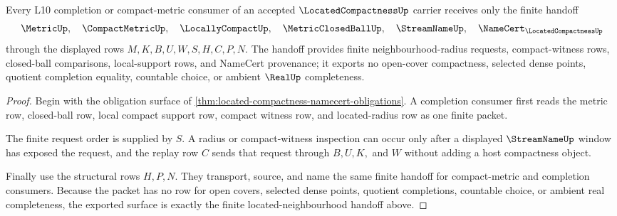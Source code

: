 \begin{theorem}
\label{thm:located-compactness-finite-net-handoff}
Every L10 completion or compact-metric consumer of an accepted $\LocatedCompactnessUp$ carrier receives only the finite handoff
$$
\MetricUp,\quad \CompactMetricUp,\quad \LocallyCompactUp,\quad \MetricClosedBallUp,\quad \StreamNameUp,\quad \NameCert_{\LocatedCompactnessUp}
$$
through the displayed rows $M,K,B,U,W,S,H,C,P,N$. The handoff provides finite neighbourhood-radius requests, compact-witness rows, closed-ball comparisons, local-support rows, and NameCert provenance; it exports no open-cover compactness, selected dense points, quotient completion equality, countable choice, or ambient $\RealUp$ completeness.
\end{theorem}
\begin{proof}
Begin with the obligation surface of \autoref{thm:located-compactness-namecert-obligations}. A completion consumer first reads the metric row, closed-ball row, local compact support row, compact witness row, and located-radius row as one finite packet.

The finite request order is supplied by $S$. A radius or compact-witness inspection can occur only after a displayed $\StreamNameUp$ window has exposed the request, and the replay row $C$ sends that request through $B,U,K,$ and $W$ without adding a host compactness object.

Finally use the structural rows $H,P,N$. They transport, source, and name the same finite handoff for compact-metric and completion consumers. Because the packet has no row for open covers, selected dense points, quotient completions, countable choice, or ambient real completeness, the exported surface is exactly the finite located-neighbourhood handoff above.
\end{proof}

